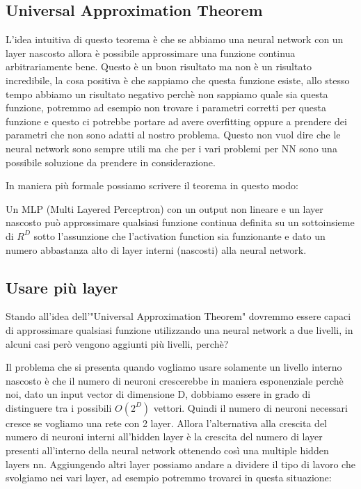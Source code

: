 \documentclass[14pt]{extreport}
\begin{document}
\subsection{Universal Approximation Theorem}

L'idea intuitiva di questo teorema è che se abbiamo una neural network con un layer nascosto allora è possibile approssimare una funzione continua
arbitrariamente bene. Questo è un buon risultato ma non è un risultato incredibile, la cosa positiva è che sappiamo che questa funzione esiste, allo
stesso tempo abbiamo un risultato negativo perchè non sappiamo quale sia questa funzione, potremmo ad esempio non trovare i parametri corretti per
questa funzione e questo ci potrebbe portare ad avere overfitting oppure a prendere dei parametri che non sono adatti al nostro problema. Questo non
vuol dire che le neural network sono sempre utili ma che per i vari problemi per NN sono una possibile soluzione da prendere in considerazione.

In maniera più formale possiamo scrivere il teorema in questo modo:

Un MLP (Multi Layered Perceptron) con un output non lineare e un layer nascosto può approssimare qualsiasi funzione continua definita su un
sottoinsieme di $R^D$ sotto l'assunzione che l'activation function sia funzionante e dato un numero abbastanza alto di layer interni (nascosti) alla
neural network. 

\subsection{Usare più layer}

Stando all'idea dell'"Universal Approximation Theorem" dovremmo essere capaci di approssimare qualsiasi funzione utilizzando una neural network a due
livelli, in alcuni casi però vengono aggiunti più livelli, perchè?

Il problema che si presenta quando vogliamo usare solamente un livello interno nascosto è che il numero di neuroni crescerebbe in maniera esponenziale
perchè noi, dato un input vector di dimensione D, dobbiamo essere in grado di distinguere tra i possibili $O(2^D)$ vettori. Quindi il numero di
neuroni necessari cresce se vogliamo una rete con 2 layer. Allora l'alternativa alla crescita del numero di neuroni interni all'hidden layer è la
crescita del numero di layer presenti all'interno della neural network ottenendo così una multiple hidden layers nn. Aggiungendo altri layer possiamo
andare a dividere il tipo di lavoro che svolgiamo nei vari layer, ad esempio potremmo trovarci in questa situazione:
\end{document}
